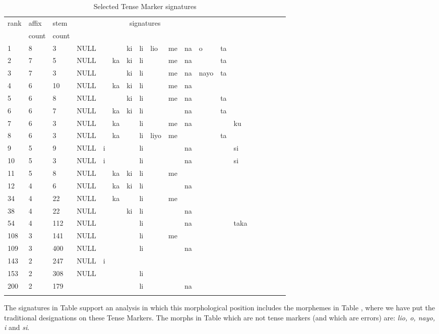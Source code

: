 \documentclass[output=paper,colorlinks,citecolor=brown,
]{langscibook}
\begin{document}
 
\begin{table}

\label{top-TM-sigs}
\begin{tabular}{lllllllllllllllllll}\lsptoprule
rank& affix & stem  & \multicolumn{9}{c}{signatures} \\
 & count & count    \\ \midrule
1 & 8 & 3 & NULL &     && ki & li & lio & me & na & o  & ta  \\
2 &  7 & 5 & NULL &&  ka & ki & li &     & me & na &    & ta  \\
3 &  7 & 3 & NULL &&     & ki & li &     & me & na &  nayo &  ta \\
4 &  6 & 10& NULL &&  ka & ki & li &     & me & na \\
5 &  6 &  8 & NULL &&     & ki & li &      & me &  na &&   ta\\
6 &  6 & 7 & NULL &&  ka & ki & li &     &    & na &  & ta \\
7 &  6 & 3 & NULL &&  ka & & li &     & me &  na &&& ku \\
8 &  6 & 3 & NULL &&  ka &    & li & liyo &  me &&&  ta\\
9 &  5 & 9 & NULL &  i  &    && li &&&  na &&&  si\\
10 & 5 & 3 & NULL&  i  &    && li &&& na &&& si \\
11 & 5 & 8 & NULL && ka & ki & li &     & me \\
12 & 4 & 6 & NULL && ka & ki & li & & & na \\
34 & 4 &22 & NULL &&  ka &    &li  & & me \\
38 & 4 &22 & NULL &&     &  ki &  li  &&& na \\
54& 4 & 112 & NULL &&     &    & li &&&  na  &&&  taka \\
108 & 3 & 141 & NULL &&  & & li  && me \\
109 & 3 &  400 & NULL && & &  li  &&& na  \\
143 & 2 &  247 & NULL &  i \\
153 & 2 &  308 & NULL &&  & & li \\
200 & 2 &179 &&   &  &  & li &&& na \\
  \lspbottomrule
\end{tabular}
\caption{Selected Tense Marker signatures}
\label{TM-sigs}
\end{table}
 

The signatures in Table  support an analysis in which this morphological position includes the morphemes in Table , where we have put the traditional designations on these Tense Markers. The morphs in Table  which are not tense markers (and which are errors) are: \textit{lio, o, nayo, i} and \textit{si}. 
 
\end{document}
